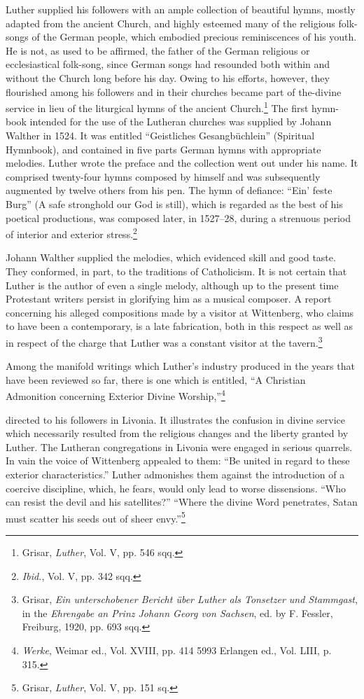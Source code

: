 Luther supplied his followers with an ample collection of beautiful hymns,
mostly adapted from the ancient Church, and highly
esteemed many of the religious folk-songs of the German people,
which embodied precious reminiscences of his youth. He is not, as
used to be affirmed, the father of the German religious or ecclesiastical
folk-song, since German songs had resounded both within
and without the Church long before his day. Owing to his efforts,
however, they flourished among his followers and in their churches
became part of the-divine service in lieu of the liturgical hymns
of the ancient Church.\footnote{Grisar, \textit{Luther}, Vol. V, pp. 546 sqq.}
The first hymn-book intended for the
use of the Lutheran churches was supplied by Johann Walther in
1524. It was entitled “Geistliches Gesangbüchlein” (Spiritual Hymnbook),
and contained in five parts German hymns with appropriate
melodies. Luther wrote the preface and the collection went out
under his name. It comprised twenty-four hymns composed by himself and
was subsequently augmented by twelve others from his pen.
The hymn of defiance: “Ein’ feste Burg” (A safe stronghold our God
is still), which is regarded as the best of his poetical productions,
was composed later, in 1527--28, during a strenuous period of interior
and exterior stress.\footnote{\textit{Ibid.}, Vol. V, pp. 342 sqq.}

Johann Walther supplied the melodies, which evidenced skill and
good taste. They conformed, in part, to the traditions of Catholicism.
It is not certain that Luther is the author of even a single melody,
although up to the present time Protestant writers persist in glorifying
him as a musical composer. A report concerning his alleged compositions
made by a visitor at Wittenberg, who claims to have been a
contemporary, is a late fabrication, both in this respect as well as in
respect of the charge that Luther was a constant visitor at the
tavern.\footnote
{Grisar, \textit{Ein unterschobener Bericht über Luther als Tonsetzer und Stammgast}, in the
\textit{Ehrengabe an Prinz Johann Georg von Sachsen}, ed. by F. Fessler, Freiburg, 1920,
pp. 693 sqq.}


Among the manifold writings which Luther’s industry produced in
the years that have been reviewed so far, there is one which is entitled,
“A Christian Admonition concerning Exterior Divine Worship,”\footnote
{\textit{Werke}, Weimar ed., Vol. XVIII, pp. 414 5993 Erlangen ed., Vol. LIII, p. 315.}

directed to his followers in Livonia. It illustrates the confusion in
divine service which necessarily resulted from the religious
changes and the liberty granted by Luther. The Lutheran congregations
in Livonia were engaged in serious quarrels. In vain the voice
of Wittenberg appealed to them: “Be united in regard to these exterior
characteristics.” Luther admonishes them against the introduction of a
coercive discipline, which, he fears, would only lead to worse
dissensions. “Who can resist the devil and his satellites?” “Where the
divine Word penetrates, Satan must scatter his seeds out of sheer
envy.”\footnote{Grisar, \textit{Luther}, Vol. V, pp. 151 sq.}

